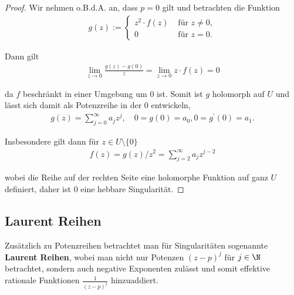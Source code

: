 \documentclass[letterpaper,10pt,german]{jupyterBook}
\begin{document}
\begin{proof}
 Wir nehmen o.B.d.A. an, dass \(p=0\) gilt und betrachten die Funktion
\begin{align*}
g(z) :=
\begin{cases}
z^2\cdot f(z)&\text{ für } z\neq 0,\\
0&\text{ für } z=0.
\end{cases}
\end{align*}
\par
Dann gilt
\begin{align*}
\lim_{z\to 0} \frac{g(z) - g(0)}{z} = \lim_{z\to 0} z\cdot f(z) =0
\end{align*}
\par
da \(f\) beschränkt in einer Umgebung um \(0\) ist. Somit ist \(g\) holomorph auf \(U\) und lässt sich damit als Potenzreihe in der \(0\) entwickeln,
\begin{align*}
g(z) = \sum_{j=0}^\infty a_j z^j,\quad 0 = g(0) = a_0, 0=g^\prime(0)=a_1.
\end{align*}
\par
Insbesondere gilt dann für \(z\in U\setminus\{0\}\)
\begin{align*}
f(z) = g(z)/z^2 = \sum_{j=2}^\infty a_j z^{j-2}
\end{align*}
\par
wobei die Reihe auf der rechten Seite eine holomorphe Funktion auf ganz \(U\) definiert, daher ist \(0\) eine hebbare Singularität.
\end{proof}


\subsection{Laurent Reihen}
\label{\detokenize{complexanalysis/residuensatz:laurent-reihen}}
\par
Zusätzlich zu Potenzreihen betrachtet man für Singularitäten sogenannte \textbf{Laurent Reihen}, wobei man nicht nur Potenzen \((z-p)^j\) für \(j\in \N\) betrachtet, sondern auch negative Exponenten zulässt und somit effektive rationale Funktionen \(\frac{1}{(z-p)^j}\) hinzuaddiert.
\end{document}
